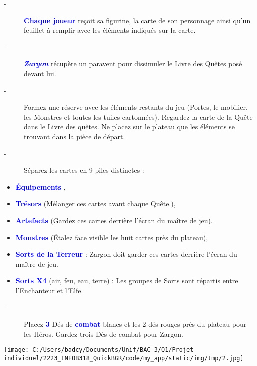 \documentclass{scrartcl}%
\begin{document}
\begin{description}%
\item[{-} ]%
%
\textcolor{blue}{%
\textbf{Chaque joueur}%
}%
\textit{ }%
 reçoit sa figurine, la carte de son personnage ainsi qu'un feuillet à remplir avec les éléments indiqués sur la carte.
%
\item[{-} ]%
%
\textcolor{blue}{\textbf{\textit{ Zargon}}}%
\textit{ }%
 récupère un paravent pour dissimuler le Livre des Quêtes posé devant lui.
%
\item[{-} ]%
%
 Formez une réserve avec les éléments restants du jeu (Portes, le mobilier, les Monstres et toutes les tuiles cartonnées). Regardez la carte de la Quête dans le Livre des quêtes. Ne placez sur le plateau que les éléments se trouvant dans la pièce de départ.
%
\item[{-} ]%
%
 Séparez les cartes en 9 piles distinctes :
%
\end{description}%
\begin{itemize}%
\item%
%
\textcolor{blue}{%
\textbf{Équipements}%
}%
,
%
\item%
%
\textcolor{blue}{%
\textbf{Trésors}%
}%
\textit{ }%
 (Mélanger ces cartes avant chaque Quête.),
%
\item%
%
\textcolor{blue}{%
\textbf{Artefacts}%
}%
\textit{ }%
 (Gardez ces cartes derrière l'écran du maître de jeu).
%
\item%
%
\textcolor{blue}{%
\textbf{Monstres}%
}%
\textit{ }%
 (Étalez face visible les huit cartes près du plateau),
%
\item%
%
\textcolor{blue}{%
\textbf{Sorts de la Terreur}%
}%
\textit{ }%
 : Zargon doit garder ces cartes derrière l'écran du maître de jeu.
%
\item%
%
\textcolor{blue}{%
\textbf{Sorts X4}%
}%
\textit{ }%
 (air, feu, eau, terre) : Les groupes de Sorts sont répartis entre l'Enchanteur et l'Elfe.
%
\end{itemize}%
\begin{description}%
\item[{-} ]%
%
 Placez %
\textcolor{blue}{%
\textbf{3}%
}%
\textit{ }%
 Dés de %
\textcolor{blue}{%
\textbf{combat}%
}%
\textit{ }%
 blancs et les 2 dés rouges près du plateau pour les Héros. Gardez trois Dés de combat pour Zargon.
%
\end{description}%
%
\begin{center}\texttt{[image: C:/Users/badcy/Documents/Unif/BAC 3/Q1/Projet individuel/2223\_INFOB318\_QuickBGR/code/my\_app/static/img/tmp/2.jpg]}\end{center}%
\end{document}
